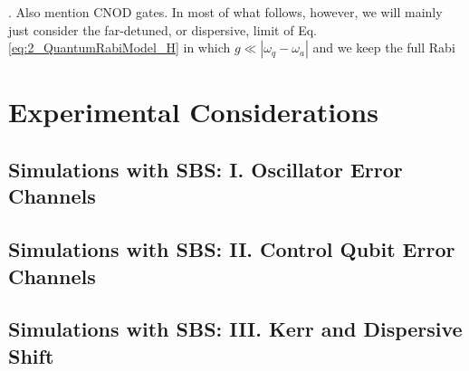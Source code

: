 \begin{figure}
    \centering
    \caption{}
    \label{fig:2_ECD_pulse_sequence}
\end{figure}





. Also mention CNOD gates.
In most of what follows, however, we will mainly just consider the far-detuned, or dispersive, limit of Eq. \eqref{eq:2_QuantumRabiModel_H} in which $g \ll |\omega_q - \omega_a|$ and we keep the full Rabi 

\section{Experimental Considerations}

\subsection{Simulations with SBS: I. Oscillator Error Channels}

\subsection{Simulations with SBS: II. Control Qubit Error Channels}

\subsection{Simulations with SBS: III. Kerr and Dispersive Shift}

